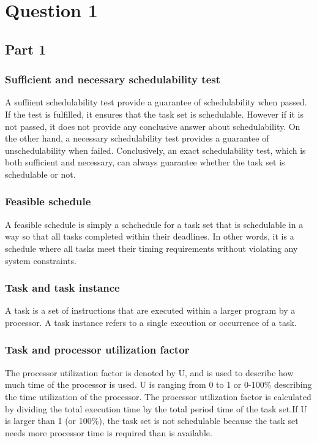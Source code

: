 \section{Question 1} 
        
        \subsection{Part 1}
            \subsubsection{Sufficient and necessary schedulability test}
            A suffiient schedulability test provide a guarantee of schedulability when passed. If the test is fulfilled, it ensures that the task set is schedulable. However if it is not passed, it does not provide any conclusive answer about schedulability. On the other hand, a necessary schedulability test provides a guarantee of unschedulability when failed. Conclusively, an exact schedulability test, which is both sufficient and necessary, can always guarantee whether the task set is schedulable or not.

            \subsubsection{Feasible schedule}
            A feasible schedule is simply a schchedule for a task set that is schedulable in a way so that all tasks completed within their deadlines. In other words, it is a schedule where all tasks meet their timing requirements without violating any system constraints.

            \subsubsection{Task and task instance}
            A task is a set of instructions that are executed within a larger program by a processor. A task instance refers to a single execution or occurrence of a task.

            \subsubsection{Task and processor utilization factor}
            The processor utilization factor is denoted by U, and is used to describe how much time of the processor is used. U is ranging from 0 to 1 or 0-100\% describing the time utilization of the processor. The processor utilization factor is calculated by dividing the total execution time by the total period time of the task set.If U is larger than 1 (or 100\%), the task set is not schedulable because the task set needs more processor time is required than is available.
            

